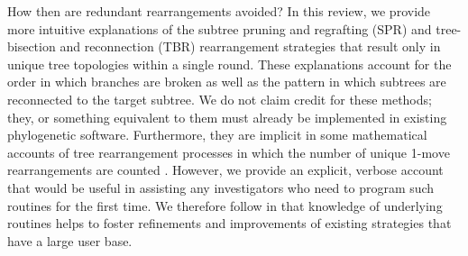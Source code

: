 \documentclass[12pt,letterpaper]{article}
\begin{document}
How then are redundant rearrangements avoided?
In this review, we provide more intuitive explanations of the subtree pruning and regrafting (SPR) and tree-bisection and reconnection (TBR) rearrangement strategies that result only in unique tree topologies within a single round.
These explanations account for the order in which branches are broken as well as the pattern in which subtrees are reconnected to the target subtree.
We do not claim credit for these methods; they, or something equivalent to them must already be implemented in existing phylogenetic software.
Furthermore, they are implicit in some mathematical accounts of tree rearrangement processes in which the number of unique 1-move rearrangements are counted \citep{allen2001subtree}.
However, we provide an explicit, verbose account that would be useful in assisting any investigators who need to program such routines for the first time. 
We therefore follow \citet{goloboff1993character} in that knowledge of underlying routines helps to foster refinements and improvements of existing strategies that have a large user base.


\end{document}
